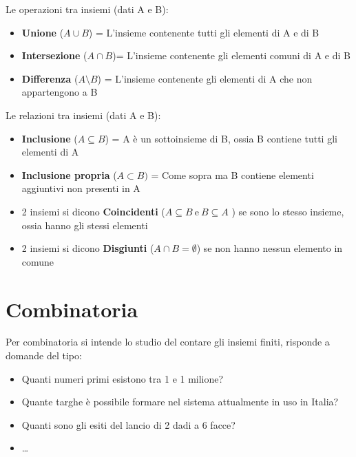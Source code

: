 \documentclass{article}
\begin{document}
Le operazioni tra insiemi (dati A e B):
\vspace{5pt}
\begin{itemize}
    \item \textbf{Unione} ($A\cup B$) = L'insieme contenente tutti gli elementi di A e di B
    \item \textbf{Intersezione} ($A\cap B$)= L'insieme contenente gli elementi comuni di A e di B

    \item \textbf{Differenza} ($A\setminus B$) = L'insieme contenente gli elementi di A che non appartengono a B
    
\end{itemize}

\vspace{10pt}

Le relazioni tra insiemi (dati A e B):
\vspace{5pt}
\begin{itemize}

    \item \textbf{Inclusione} ($A\subseteq B$) =  A è un sottoinsieme di B, ossia B contiene tutti gli elementi di A

    \item \textbf{Inclusione propria} ($A\subset B)$ = Come sopra ma B contiene elementi aggiuntivi non presenti in A

    \item 2 insiemi si dicono \textbf{Coincidenti} ($A\subseteq B\ \text{e} \ B\subseteq A$ ) se sono lo stesso insieme, ossia hanno gli stessi elementi

    \item 2 insiemi si dicono \textbf{Disgiunti} ($A\cap B = \emptyset$) se non hanno nessun elemento in comune
    
\end{itemize}

\newpage

\section{Combinatoria}

Per combinatoria si intende lo studio del contare gli insiemi finiti, risponde a domande del tipo:
\begin{itemize}
    \item  Quanti numeri primi esistono tra 1 e 1 milione?
    \item  Quante targhe è possibile formare nel sistema attualmente in uso in Italia?
    \item  Quanti sono gli esiti del lancio di 2 dadi a 6 facce?
    \item \ldots
\end{itemize}
\end{document}
